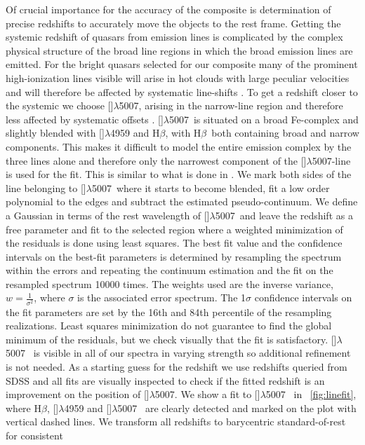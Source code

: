 \documentclass{aa}    %
\newcommand{\figref}[1]{\ref{fig:#1}}
\newcommand{\Fig}[1]{\figurename~\figref{#1}}
\newcommand{\hb}{H$\beta$}
\newcommand{\oiii}{[\ion{O}{iii}]$\lambda$5007}
\begin{document}
Of crucial importance for the accuracy of the composite is
determination of precise redshifts to accurately move the objects to
the rest frame. Getting the systemic redshift of quasars from emission
lines is complicated by the complex physical structure of the broad
line regions in which the broad emission lines are emitted. For the
bright quasars selected for our composite many of the prominent
high-ionization lines visible will arise in hot clouds with large
peculiar velocities and will therefore be affected by systematic
line-shifts \citep{Tytler1992, Richards2002b, Gaskell2013}. To get a
redshift closer to the systemic we choose \oiii, arising in the
narrow-line region and therefore less affected by systematic offsets
\citep{Hewett2010}. \oiii~is situated on a broad Fe-complex and
slightly blended with []$\lambda$4959 and \hb, with \hb~both containing broad and narrow components.  
This makes it difficult to
model the entire emission complex by the three lines alone and
therefore only the narrowest component of the \oiii-line is used for
the fit. This is similar to what is done in \citet{VandenBerk2001}.
We mark both sides of the line belonging to
\oiii~where it starts to become blended, fit a low order polynomial
to the edges and subtract the estimated pseudo-continuum.
We define a Gaussian in terms of the rest wavelength of \oiii~and
leave the redshift as a free parameter and fit to the selected
region where a weighted minimization of the residuals is done using
least squares. The best fit value and the confidence intervals on the
best-fit parameters is determined by resampling the spectrum within
the errors and repeating the continuum estimation and the fit on the
resampled spectrum 10000 times. The weights used are the inverse
variance, $ w = \frac{1}{\sigma^2}$, where $\sigma$ is the associated
error spectrum. The 1$\sigma$ confidence intervals on the fit
parameters are set by the 16th and 84th percentile of the resampling
realizations. Least squares minimization do not
guarantee to find the global minimum of the residuals, but we check
visually that the fit is satisfactory.  \oiii~ is visible in all of
our spectra in varying strength so additional refinement is not
needed. As a starting guess for the redshift we use redshifts queried
from SDSS and all fits are visually inspected to check if the fitted
redshift is an improvement on the position of \oiii. We show a fit to
\oiii~ in \Fig{linefit}, where \hb, []$\lambda$4959 and
\oiii~ are clearly detected and marked on the plot with vertical
dashed lines. We transform all redshifts to barycentric standard-of-rest for consistent
\end{document}
